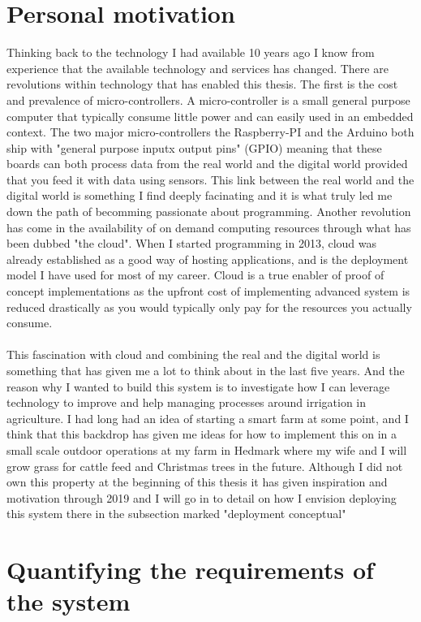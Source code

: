\documentclass[]{uiophd}
\begin{document}
\section{Personal motivation}
Thinking back to the technology I had available 10 years ago I know from experience that the available technology and services has changed.  There are revolutions within technology that has enabled this thesis. The first is the cost and prevalence of micro-controllers. A micro-controller is a small general purpose computer that typically consume little power and can easily used in an embedded context. The two major micro-controllers the Raspberry-PI and the Arduino both ship with "general purpose inputx output pins" (GPIO) meaning that these boards can both process data from the real world and the digital world provided that you feed it with data using sensors. This link between the real world and the digital world is something I find deeply facinating and it is what truly led me down the path of becomming passionate about programming. Another revolution has come in the availability of on demand computing resources through what has been dubbed "the cloud". When I started programming in 2013, cloud was already established as a good way of hosting applications, and is the deployment model I have used for most of my career. Cloud is a true enabler of proof of concept implementations as the upfront cost of implementing advanced system is reduced drastically as you would typically only pay for the resources you actually consume.
\\\\
This fascination with cloud and combining the real and the digital world is something that has given me a lot to think about in the last five years. And the reason why I wanted to build this system is to investigate how I can leverage technology to improve and help managing processes around irrigation in agriculture. I had long had an idea of starting a smart farm at some point, and I think that this backdrop has given me ideas for how to implement this on in a small scale outdoor operations at my farm in Hedmark where my wife and I will grow grass for cattle feed and Christmas trees in the future. Although I did not own this property at the beginning of this thesis it has given inspiration and motivation through 2019 and I will go in to detail on how I envision deploying this system there in the subsection marked "deployment conceptual"

\section{Quantifying the requirements of the system}
\end{document}

